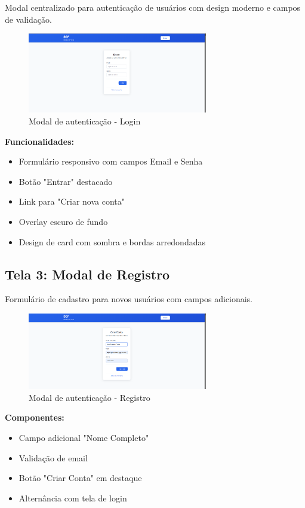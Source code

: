 \documentclass[12pt,a4paper]{article}
\begin{document}
Modal centralizado para autenticação de usuários com design moderno e campos de validação.

\begin{figure}[H]
\centering
\includegraphics[width=0.7\textwidth]{wireframes/02_modal_login.png}
\caption{Modal de autenticação - Login}
\label{fig:modal_login}
\end{figure}

\textbf{Funcionalidades:}
\begin{itemize}
    \item Formulário responsivo com campos Email e Senha
    \item Botão "Entrar" destacado
    \item Link para "Criar nova conta"
    \item Overlay escuro de fundo
    \item Design de card com sombra e bordas arredondadas
\end{itemize}

\subsection{Tela 3: Modal de Registro}

Formulário de cadastro para novos usuários com campos adicionais.

\begin{figure}[H]
\centering
\includegraphics[width=0.7\textwidth]{wireframes/03_modal_registro.png}
\caption{Modal de autenticação - Registro}
\label{fig:modal_registro}
\end{figure}

\textbf{Componentes:}
\begin{itemize}
    \item Campo adicional "Nome Completo"
    \item Validação de email
    \item Botão "Criar Conta" em destaque
    \item Alternância com tela de login
\end{itemize}
\end{document}
